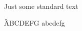 \documentclass[12pt,twoside,a4paper]{book}
\begin{document}
\mainmatter
Just some standard text

\G ABCDEFG abcdefg

\end{document}
